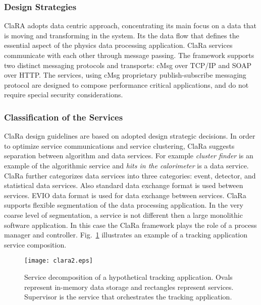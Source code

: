 \subsubsection{Design Strategies}

ClaRA adopts data centric approach, concentrating its main focus on a data that is moving and transforming in the system. 
Its the data flow that defines the essential aspect of the physics data processing application.
ClaRa services communicate with each other through message passing.  The
framework supports two distinct messaging protocols and transports: cMsg over 
TCP/IP and SOAP over HTTP. The services, using cMsg proprietary 
publish-subscribe messaging protocol are designed to compose performance 
critical applications, and do not require special security considerations. 

\subsubsection{Classification of the Services}

ClaRa design guidelines are based on adopted design strategic decisions. In 
order to optimize service communications and service clustering, ClaRa 
suggests separation between algorithm and data services. For example 
{\it cluster finder} is an example of the algorithmic service and 
{\it hits in the calorimeter} is a data service. ClaRa further categorizes 
data services into three categories: event, detector, and statistical data 
services. Also standard data exchange format is used between services. 
EVIO data format is used for data exchange between services.  ClaRa 
supports flexible segmentation of the data processing application. In the 
very coarse level of segmentation, a service is not different then a large 
monolithic software application. In this case the ClaRa framework plays the 
role of a process manager and controller.  Fig.~\ref{fig:clara2} illustrates 
an example of a tracking application service composition.

\begin{figure}[htbp]
\centering
\texttt{[image: clara2.eps]} 
\caption{\small{Service decomposition of a hypothetical tracking 
application.  Ovals represent in-memory data storage and rectangles 
represent services. Supervisor is the service that orchestrates the 
tracking application.}}
\label{fig:clara2}
\end{figure}

